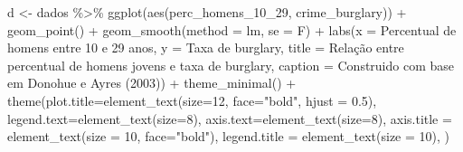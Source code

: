 \documentclass[
]{article}
\newenvironment{Shaded}{\begin{snugshade}}{\end{snugshade}}
\newcommand{\AttributeTok}[1]{\textcolor[rgb]{0.77,0.63,0.00}{#1}}
\newcommand{\DecValTok}[1]{\textcolor[rgb]{0.00,0.00,0.81}{#1}}
\newcommand{\FloatTok}[1]{\textcolor[rgb]{0.00,0.00,0.81}{#1}}
\newcommand{\FunctionTok}[1]{\textcolor[rgb]{0.00,0.00,0.00}{#1}}
\newcommand{\NormalTok}[1]{#1}
\newcommand{\OtherTok}[1]{\textcolor[rgb]{0.56,0.35,0.01}{#1}}
\newcommand{\SpecialCharTok}[1]{\textcolor[rgb]{0.00,0.00,0.00}{#1}}
\newcommand{\StringTok}[1]{\textcolor[rgb]{0.31,0.60,0.02}{#1}}
\begin{document}
\begin{Shaded}
\begin{Highlighting}[]
\NormalTok{d }\OtherTok{\textless{}{-}}\NormalTok{ dados }\SpecialCharTok{\%\textgreater{}\%} 
  \FunctionTok{ggplot}\NormalTok{(}\FunctionTok{aes}\NormalTok{(perc\_homens\_10\_29, crime\_burglary)) }\SpecialCharTok{+}
  \FunctionTok{geom\_point}\NormalTok{() }\SpecialCharTok{+} 
  \FunctionTok{geom\_smooth}\NormalTok{(}\AttributeTok{method =} \StringTok{\textquotesingle{}lm\textquotesingle{}}\NormalTok{, }\AttributeTok{se =}\NormalTok{ F) }\SpecialCharTok{+}
  \FunctionTok{labs}\NormalTok{(}\AttributeTok{x =} \StringTok{\textquotesingle{}Percentual de homens entre 10 e 29 anos\textquotesingle{}}\NormalTok{,}
       \AttributeTok{y =} \StringTok{\textquotesingle{}Taxa de burglary\textquotesingle{}}\NormalTok{,}
       \AttributeTok{title =} \StringTok{\textquotesingle{}Relação entre percentual de homens jovens e taxa de burglary\textquotesingle{}}\NormalTok{,}
       \AttributeTok{caption =} \StringTok{\textquotesingle{}Construido com base em Donohue e Ayres (2003)\textquotesingle{}}\NormalTok{) }\SpecialCharTok{+} 
  \FunctionTok{theme\_minimal}\NormalTok{() }\SpecialCharTok{+}
  \FunctionTok{theme}\NormalTok{(}\AttributeTok{plot.title=}\FunctionTok{element\_text}\NormalTok{(}\AttributeTok{size=}\DecValTok{12}\NormalTok{, }\AttributeTok{face=}\StringTok{"bold"}\NormalTok{, }\AttributeTok{hjust =} \FloatTok{0.5}\NormalTok{),}
        \AttributeTok{legend.text=}\FunctionTok{element\_text}\NormalTok{(}\AttributeTok{size=}\DecValTok{8}\NormalTok{),}
        \AttributeTok{axis.text=}\FunctionTok{element\_text}\NormalTok{(}\AttributeTok{size=}\DecValTok{8}\NormalTok{),}
        \AttributeTok{axis.title =} \FunctionTok{element\_text}\NormalTok{(}\AttributeTok{size =} \DecValTok{10}\NormalTok{, }\AttributeTok{face=}\StringTok{"bold"}\NormalTok{),}
        \AttributeTok{legend.title =} \FunctionTok{element\_text}\NormalTok{(}\AttributeTok{size =} \DecValTok{10}\NormalTok{),}
\NormalTok{        )}


\end{Highlighting}
\end{Shaded}
\end{document}
